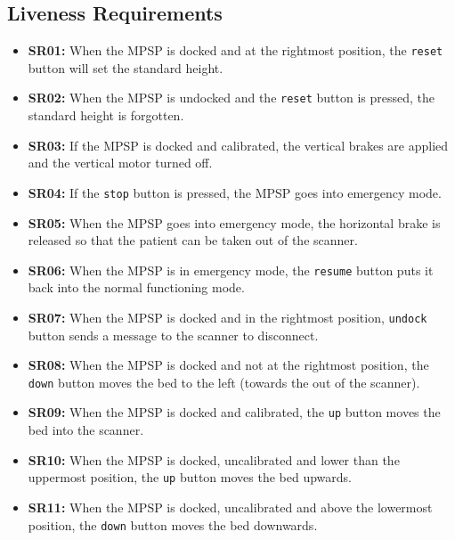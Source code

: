 \subsection{Liveness Requirements}
\begin{itemize}
    \item \textbf{SR01:}  When the MPSP is docked and at the rightmost position, the \verb$reset$ button will set the standard height. \\
    \item \textbf{SR02:} When the MPSP is undocked and the \verb$reset$ button is pressed, the standard height is forgotten.
    \item \textbf{SR03:} If the MPSP is docked and calibrated, the vertical brakes are applied and the vertical motor turned off. \\
    \item \textbf{SR04:} If the \verb$stop$ button is pressed, the MPSP goes into emergency mode. \\
    \item \textbf{SR05:} When the MPSP goes into emergency mode, the horizontal brake is released so that the patient can be taken out of the scanner. \\
    \item \textbf{SR06:} When the MPSP is in emergency mode, the \verb$resume$ button puts it back into the normal functioning mode.  \\
    \item \textbf{SR07:} When the MPSP is docked and in the rightmost position, \verb$undock$ button sends a message to the scanner to disconnect.\\
    \item \textbf{SR08:}  When the MPSP is docked and not at the rightmost position, the \verb$down$ button moves the bed to the left (towards the out of the scanner). \\
    \item \textbf{SR09:} When the MPSP is docked and calibrated, the \verb $up$ button moves the bed into the scanner. \\
    \item \textbf{SR10:} When the MPSP is docked, uncalibrated and lower than the uppermost position, the \verb$up$ button moves the bed upwards. \\
    \item \textbf{SR11:} When the MPSP is docked, uncalibrated and above the lowermost position, the \verb$down$ button moves the bed downwards. \\

     
\end{itemize}
